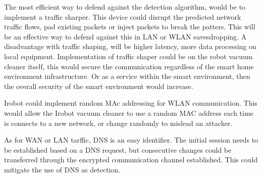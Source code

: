 The most efficient way to defend against the detection algorithm, would be to implement a traffic sharper. This device could disrupt the predicted network traffic flows, pad existing packets or inject packets to break the patters. This will be an effective way to defend against this in LAN or WLAN eavesdropping. A disadvantage with traffic shaping, will be higher latency, more data processing on local equipment. Implementation of traffic shaper could be on the robot vacuum cleaner itself, this would secure the communication regardless of the smart home environment infrastructure. Or as a service within the smart environment, then the overall security of the smart environment would increase. 

Irobot could implement random MAc addressing \cite{random_mac_bernardos2020rfc} for WLAN communication. This would allow the Irobot vacuum cleaner to use a random MAC address each time is connects to a new network, or change randomly to mislead an attacker. 

As for WAN or LAN tarffic, DNS is an easy identifier. The initial session needs to be established based on a DNS request, but consecutive changes could be transferred through the encrypted communication channel established. This could mitigate the use of DNS as detection. 



